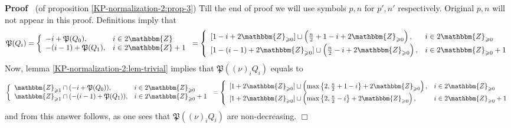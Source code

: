 \documentclass{article}
\newenvironment{proof}{\noindent\textbf{Proof\ }}{\hspace*{\fill}$\Box$\medskip}
\numberwithin{definition}{section}
\numberwithin{lemma}{section}
\numberwithin{proposition}{section}
{\theorembodyfont{\rmfamily}\newtheorem{remark}{Remark}
\numberwithin{remark}{section}
}
\begin{document}
\begin{proof}
  (of proposition \ref{KP-normalization-2:prop-3}) Till the end of proof we
  will use symbols $p, n$ for $p', n'$ respectively. Original $p, n$ will not
  appear in this proof. Definitions imply that
  \[ \mathfrak{P} ( Q_i) = \left\{ \begin{array}{ll}
       - i +\mathfrak{P} ( Q_0), & i \in 2\mathbbm{Z}\\
       - ( i - 1) +\mathfrak{P} ( Q_1), & i \in 2\mathbbm{Z}+ 1
     \end{array} \right. = \left\{ \begin{array}{ll}
       {}[ 1 - i + 2\mathbbm{Z}_{\geqslant 0}] \sqcup \left( \frac{n}{2} + 1 -
       i + 2\mathbbm{Z}_{\geqslant 0} \right), & i \in 2\mathbbm{Z}_{\geqslant
       0}\\
       {}[ 1 - ( i - 1) + 2\mathbbm{Z}_{\geqslant 0}] \sqcup \left(
       \frac{n}{2} - i + 2\mathbbm{Z}_{\geqslant 0} \right), & i \in
       2\mathbbm{Z}_{\geqslant 0} + 1
     \end{array} \right. \]
  Now, lemma \ref{KP-normalization-2:lem-trivial} implies that $\mathfrak{P} (
  ( \nu)^{}_i Q_i)$ equals to
  \[ \left\{ \begin{array}{ll}
       \mathbbm{Z}_{\geqslant 1} \cap ( - i +\mathfrak{P} ( Q_0)), & i \in
       2\mathbbm{Z}_{\geqslant 0}\\
       \mathbbm{Z}_{\geqslant 1} \cap ( - ( i - 1) +\mathfrak{P} ( Q_1)), & i
       \in 2\mathbbm{Z}_{\geqslant 0} + 1
     \end{array} \right. = \left\{ \begin{array}{ll}
       {}[ 1 + 2\mathbbm{Z}_{\geqslant 0}] \sqcup \left( \max \left\{ 2,
       \frac{n}{2} + 1 - i \right\} + 2\mathbbm{Z}_{\geqslant 0} \right), & i
       \in 2\mathbbm{Z}_{\geqslant 0}\\
       {}[ 1 + 2\mathbbm{Z}_{\geqslant 0}] \sqcup \left( \max \left\{ 2,
       \frac{n}{2} - i \right\} + 2\mathbbm{Z}_{\geqslant 0} \right), & i \in
       2\mathbbm{Z}_{\geqslant 0} + 1
     \end{array} \right. \]
  and from this answer follows, as one sees that $\mathfrak{P} ( ( \nu)^{}_i
  Q_i)$ are non-decreasing.
\end{proof}
\end{document}
